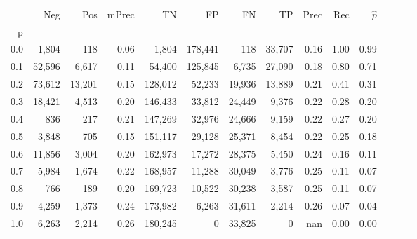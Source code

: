 \begin{tabular}{rrrrrrrrrrrrrr}
\toprule
{} &     Neg &     Pos & mPrec &       TN &       FP &      FN &      TP &  Prec &   Rec & $\hat{p}$ \\
p   &         &         &       &          &          &         &         &       &       &           \\
\midrule
0.0 &   1,804 &     118 &  0.06 &    1,804 &  178,441 &     118 &  33,707 &  0.16 &  1.00 &      0.99 \\
0.1 &  52,596 &   6,617 &  0.11 &   54,400 &  125,845 &   6,735 &  27,090 &  0.18 &  0.80 &      0.71 \\
0.2 &  73,612 &  13,201 &  0.15 &  128,012 &   52,233 &  19,936 &  13,889 &  0.21 &  0.41 &      0.31 \\
0.3 &  18,421 &   4,513 &  0.20 &  146,433 &   33,812 &  24,449 &   9,376 &  0.22 &  0.28 &      0.20 \\
0.4 &     836 &     217 &  0.21 &  147,269 &   32,976 &  24,666 &   9,159 &  0.22 &  0.27 &      0.20 \\
0.5 &   3,848 &     705 &  0.15 &  151,117 &   29,128 &  25,371 &   8,454 &  0.22 &  0.25 &      0.18 \\
0.6 &  11,856 &   3,004 &  0.20 &  162,973 &   17,272 &  28,375 &   5,450 &  0.24 &  0.16 &      0.11 \\
0.7 &   5,984 &   1,674 &  0.22 &  168,957 &   11,288 &  30,049 &   3,776 &  0.25 &  0.11 &      0.07 \\
0.8 &     766 &     189 &  0.20 &  169,723 &   10,522 &  30,238 &   3,587 &  0.25 &  0.11 &      0.07 \\
0.9 &   4,259 &   1,373 &  0.24 &  173,982 &    6,263 &  31,611 &   2,214 &  0.26 &  0.07 &      0.04 \\
1.0 &   6,263 &   2,214 &  0.26 &  180,245 &        0 &  33,825 &       0 &   nan &  0.00 &      0.00 \\
\bottomrule
\end{tabular}
